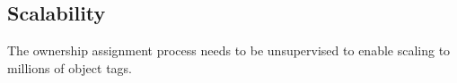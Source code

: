 \subsection{Scalability}
The ownership assignment process needs to be unsupervised to enable scaling to millions of object tags. 








 
